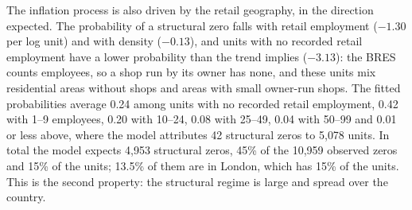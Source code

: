 The inflation process is also driven by the retail geography, in the direction expected.
The probability of a structural zero falls with retail employment ($-1.30$ per log unit) and with density ($-0.13$), and units with no recorded retail employment have a lower probability than the trend implies ($-3.13$): the BRES counts employees, so a shop run by its owner has none, and these units mix residential areas without shops and areas with small owner-run shops.
The fitted probabilities average 0.24 among units with no recorded retail employment, 0.42 with 1--9 employees, 0.20 with 10--24, 0.08 with 25--49, 0.04 with 50--99 and 0.01 or less above, where the model attributes 42 structural zeros to 5{,}078 units.
In total the model expects 4{,}953 structural zeros, 45\% of the 10{,}959 observed zeros and 15\% of the units; 13.5\% of them are in London, which has 15\% of the units.
This is the second property: the structural regime is large and spread over the country.

